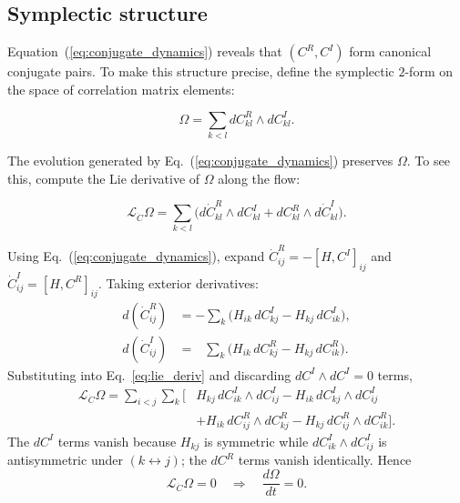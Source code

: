 \documentclass[aps,pra,preprint,groupedaddress,amsmath,amssymb,floatfix]{revtex4-2}
\begin{document}
\subsection{Symplectic structure}
\label{sec:symplectic}

Equation~(\ref{eq:conjugate_dynamics}) reveals that $(C^R, C^I)$ form canonical conjugate pairs. To make this structure precise, define the symplectic $2$-form on the space of correlation matrix elements:

\begin{equation}
\Omega = \sum_{k<l} dC^R_{kl} \wedge dC^I_{kl}.
\label{eq:symplectic}
\end{equation}

The evolution generated by Eq.~(\ref{eq:conjugate_dynamics}) preserves $\Omega$. To see this, compute the Lie derivative of $\Omega$ along the flow:

\begin{equation}
\mathcal{L}_{\dot{C}} \Omega = \sum_{k<l} \bigl( d\dot{C}^R_{kl} \wedge dC^I_{kl} + dC^R_{kl} \wedge d\dot{C}^I_{kl} \bigr).
\label{eq:lie_deriv}
\end{equation}

Using Eq.~(\ref{eq:conjugate_dynamics}), expand $\dot C^R_{ij} = -[H, C^I]_{ij}$ and $\dot C^I_{ij} = [H, C^R]_{ij}$. Taking exterior derivatives:
\begin{align*}
d(\dot C^R_{ij}) &= -\sum_{k} \bigl(H_{ik}\,dC^I_{kj} - H_{kj}\,dC^I_{ik}\bigr),\\
d(\dot C^I_{ij}) &= \;\;\,\sum_{k} \bigl(H_{ik}\,dC^R_{kj} - H_{kj}\,dC^R_{ik}\bigr).
\end{align*}
Substituting into Eq.~\eqref{eq:lie_deriv} and discarding $dC^I\wedge dC^I=0$ terms,
\begin{align*}
\mathcal{L}_{\dot C}\Omega = \sum_{i<j}\sum_{k} \bigl[&H_{kj}\,dC^I_{ik}\wedge dC^I_{ij}
- H_{ik}\,dC^I_{kj}\wedge dC^I_{ij} \\
&+ H_{ik}\,dC^R_{ij}\wedge dC^R_{kj}
- H_{kj}\,dC^R_{ij}\wedge dC^R_{ik}\bigr].
\end{align*}
The $dC^I$ terms vanish because $H_{kj}$ is symmetric while $dC^I_{ik}\wedge dC^I_{ij}$ is antisymmetric under $(k\leftrightarrow j)$; the $dC^R$ terms vanish identically. Hence
\begin{equation}
\mathcal{L}_{\dot C}\Omega = 0 \quad \Longrightarrow \quad \frac{d\Omega}{dt} = 0.
\label{eq:omega_conserved}
\end{equation}
\end{document}
